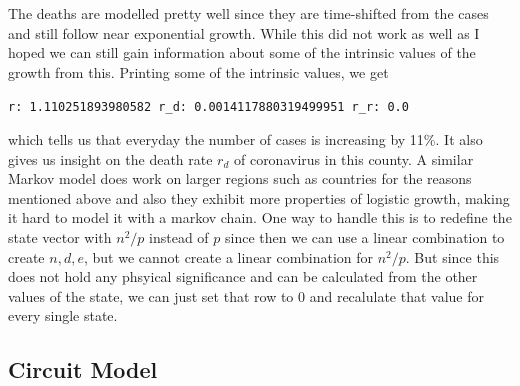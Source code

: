 \documentclass{report}
\begin{document}
                The deaths are modelled pretty well since they are time-shifted from the cases and still follow near exponential growth. While this did not work as well as I hoped we can still gain information about some of the intrinsic values of the growth from this. Printing some of the intrinsic values, we get 
                \newline
                \begin{center}
                    \lstinline{r: 1.110251893980582 r_d: 0.0014117880319499951 r_r: 0.0}
                \end{center}
                which tells us that everyday the number of cases is increasing by 11\%. It also gives us insight on the death rate $r_d$ of coronavirus in this county.
                \newline\indent
                A similar Markov model does work on larger regions such as countries for the reasons mentioned above and also they exhibit more properties of logistic growth, making it hard to model it with a markov chain.
                \newline\indent
                One way to handle this is to redefine the state vector with $n^2/p$ instead of $p$ since then we can use a linear combination to create $n, d, e$, but we cannot create a linear combination for $n^2/p$. But since this does not hold any phsyical significance and can be calculated from the other values of the state, we can just set that row to 0 and recalulate that value for every single state.
        \subsection{Circuit Model}
\end{document}

